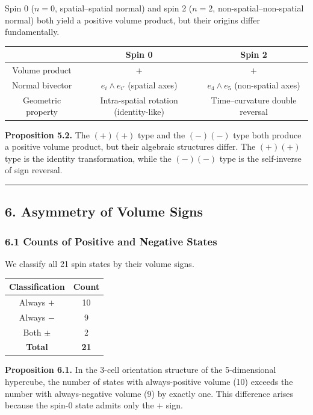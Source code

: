 \documentclass[a4paper,11pt]{article}
\newcounter{none}
\begin{document}
Spin 0 ($n = 0$, spatial--spatial normal) and spin 2 ($n = 2$, non-spatial--non-spatial normal) both yield a positive volume product, but their origins differ fundamentally.

{\def\LTcaptype{none}
\begin{longtable}[]{@{}ccc@{}}
\toprule
& Spin 0 & Spin 2 \\
\midrule
\endhead
\bottomrule
\endlastfoot
Volume product & $+$ & $+$ \\
Normal bivector & $e_i \wedge e_{i'}$ (spatial axes) & $e_4 \wedge e_5$ (non-spatial axes) \\
Geometric property & Intra-spatial rotation (identity-like) & Time--curvature double reversal \\
\end{longtable}
}

\textbf{Proposition 5.2.} The $(+)(+)$ type and the $(-)(-)$ type both produce a positive volume product, but their algebraic structures differ. The $(+)(+)$ type is the identity transformation, while the $(-)(-)$ type is the self-inverse of sign reversal.

\begin{center}\rule{0.5\linewidth}{0.5pt}\end{center}

\subsection*{6. Asymmetry of Volume Signs}

\subsubsection*{6.1 Counts of Positive and Negative States}

We classify all 21 spin states by their volume signs.

{\def\LTcaptype{none}
\begin{longtable}[]{@{}cc@{}}
\toprule
Classification & Count \\
\midrule
\endhead
\bottomrule
\endlastfoot
Always $+$ & 10 \\
Always $-$ & 9 \\
Both $\pm$ & 2 \\
\textbf{Total} & \textbf{21} \\
\end{longtable}
}

\textbf{Proposition 6.1.} In the 3-cell orientation structure of the 5-dimensional hypercube, the number of states with always-positive volume (10) exceeds the number with always-negative volume (9) by exactly one. This difference arises because the spin-0 state admits only the $+$ sign.
\end{document}
